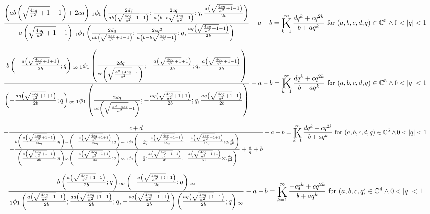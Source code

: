 \documentclass{article}
\newcommand{\bigK}{\mathop{\raisebox{-5pt}{\huge K}}}
\begin{document}
\[\frac{\left(a b \left(\sqrt{\frac{4 c q}{a^2}+1}-1\right)+2 c q\right) \, _1\phi _1\left(\frac{2 d q}{a b \left(\sqrt{\frac{4 c q}{a^2}+1}-1\right)};\frac{2 c q}{a \left(b-b \sqrt{\frac{4 c q}{a^2}+1}\right)};q,\frac{a \left(\sqrt{\frac{4 c q}{a^2}+1}-1\right)}{2 b}\right)}{a \left(\sqrt{\frac{4 c q}{a^2}+1}-1\right) \, _1\phi _1\left(\frac{2 d q}{a b \left(\sqrt{\frac{4 c q}{a^2}+1}-1\right)};\frac{2 c q^2}{a \left(b-b \sqrt{\frac{4 c q}{a^2}+1}\right)};q,\frac{a q \left(\sqrt{\frac{4 c q}{a^2}+1}-1\right)}{2 b}\right)}-a-b=\bigK_{k=1}^{\infty}\frac{d q^k+c q^{2 k}}{b+a q^k}\text{ for }(a,b,c,d,q)\in \mathbb{C}^5\land 0<\left| q\right| <1\] 

\[\frac{b \left(-\frac{a \left(\sqrt{\frac{4 c q}{a^2}+1}+1\right)}{2 b};q\right){}_{\infty } \, _1\phi _1\left(\frac{2 d q}{a b \left(\sqrt{\frac{a^2+4 c q}{a^2}}-1\right)};-\frac{a \left(\sqrt{\frac{4 c q}{a^2}+1}+1\right)}{2 b};q,\frac{a \left(\sqrt{\frac{4 c q}{a^2}+1}-1\right)}{2 b}\right)}{\left(-\frac{a q \left(\sqrt{\frac{4 c q}{a^2}+1}+1\right)}{2 b};q\right){}_{\infty } \, _1\phi _1\left(\frac{2 d q}{a b \left(\sqrt{\frac{a^2+4 c q}{a^2}}-1\right)};-\frac{a q \left(\sqrt{\frac{4 c q}{a^2}+1}+1\right)}{2 b};q,\frac{a q \left(\sqrt{\frac{4 c q}{a^2}+1}-1\right)}{2 b}\right)}-a-b=\bigK_{k=1}^{\infty}\frac{d q^k+c q^{2 k}}{b+a q^k}\text{ for }(a,b,c,d,q)\in \mathbb{C}^5\land 0<\left| q\right| <1\] 

\[-\frac{c+d}{-\frac{b \left(\frac{a \left(\sqrt{\frac{4 c q}{a^2}+1}-1\right)}{2 b q};q\right){}_{\infty } \left(-\frac{a \left(\sqrt{\frac{4 c q}{a^2}+1}+1\right)}{2 b q};q\right){}_{\infty } \, _1\phi _2\left(-\frac{c}{d q};\frac{a \left(\sqrt{\frac{4 c q}{a^2}+1}-1\right)}{2 b q},-\frac{a \left(\sqrt{\frac{4 c q}{a^2}+1}+1\right)}{2 b q};q,\frac{d}{b^2}\right)}{\left(\frac{a \left(\sqrt{\frac{4 c q}{a^2}+1}-1\right)}{2 b};q\right){}_{\infty } \left(-\frac{a \left(\sqrt{\frac{4 c q}{a^2}+1}+1\right)}{2 b};q\right){}_{\infty } \, _1\phi _2\left(-\frac{c}{d};\frac{a \left(\sqrt{\frac{4 c q}{a^2}+1}-1\right)}{2 b},-\frac{a \left(\sqrt{\frac{4 c q}{a^2}+1}+1\right)}{2 b};q,\frac{d q}{b^2}\right)}+\frac{a}{q}+b}-a-b=\bigK_{k=1}^{\infty}\frac{d q^k+c q^{2 k}}{b+a q^k}\text{ for }(a,b,c,d,q)\in \mathbb{C}^5\land 0<\left| q\right| <1\] 

\[\frac{b \left(\frac{a \left(\sqrt{\frac{4 c q}{a^2}+1}-1\right)}{2 b};q\right){}_{\infty } \left(-\frac{a \left(\sqrt{\frac{4 c q}{a^2}+1}+1\right)}{2 b};q\right){}_{\infty }}{\, _1\phi _1\left(\frac{a \left(\sqrt{\frac{4 c q}{a^2}+1}-1\right)}{2 b};\frac{a q \left(\sqrt{\frac{4 c q}{a^2}+1}-1\right)}{2 b};q,-\frac{a q \left(\sqrt{\frac{4 c q}{a^2}+1}+1\right)}{2 b}\right) \left(\frac{a q \left(\sqrt{\frac{4 c q}{a^2}+1}-1\right)}{2 b};q\right){}_{\infty }}-a-b=\bigK_{k=1}^{\infty}\frac{-c q^k+c q^{2 k}}{b+a q^k}\text{ for }(a,b,c,q)\in \mathbb{C}^4\land 0<\left| q\right| <1\] 
\end{document}
